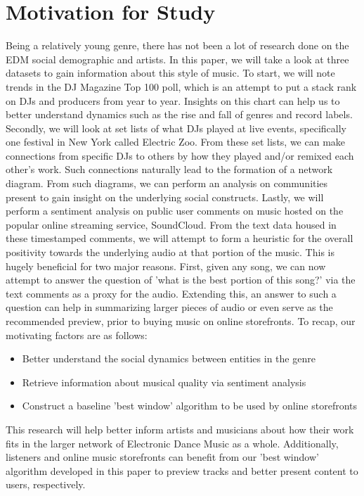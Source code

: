 \documentclass[12pt]{dalcsthesis}
\begin{document}
\section{Motivation for Study}

Being a relatively young genre, there has not been a lot of research done on the EDM social demographic and artists. In this paper, we will take a look at three datasets to gain information about this style of music. To start, we will note trends in the DJ Magazine Top 100 poll, which is an attempt to put a stack rank on DJs and producers from year to year. Insights on this chart can help us to better understand dynamics such as the rise and fall of genres and record labels. Secondly, we will look at set lists of what DJs played at live events, specifically one festival in New York called Electric Zoo. From these set lists, we can make connections from specific DJs to others by how they played and/or remixed each other's work. Such connections naturally lead to the formation of a network diagram. From such diagrams, we can perform an analysis on communities present to gain insight on the underlying social constructs. Lastly, we will perform a sentiment analysis on public user comments on music hosted on the popular online streaming service, SoundCloud. From the text data housed in these timestamped comments, we will attempt to form a heuristic for the overall positivity towards the underlying audio at that portion of the music. This is hugely beneficial for two major reasons. First, given any song, we can now attempt to answer the question of 'what is the best portion of this song?' via the text comments as a proxy for the audio. Extending this, an answer to such a question can help in summarizing larger pieces of audio or even serve as the recommended preview, prior to buying music on online storefronts. To recap, our motivating factors are as follows:

\begin{itemize}
  \item Better understand the social dynamics between entities in the genre
  \item Retrieve information about musical quality via sentiment analysis
  \item Construct a baseline 'best window' algorithm to be used by online storefronts
\end{itemize}

This research will help better inform artists and musicians about how their work fits in the larger network of Electronic Dance Music as a whole. Additionally, listeners and online music storefronts can benefit from our 'best window' algorithm developed in this paper to preview tracks and better present content to users, respectively. 
\end{document}
